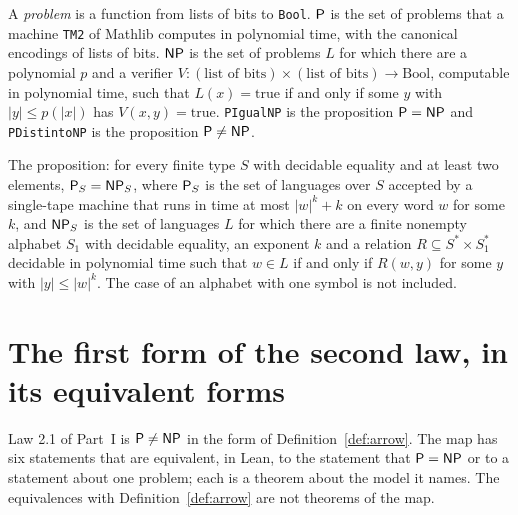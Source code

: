\begin{definition}[$\cP = \cNP$ and $\cP \ne \cNP$, on the machines of Mathlib]
  \label{def:arrow-p-ne-np}
  \leanok
  A \emph{problem} is a function from lists of bits to \texttt{Bool}. $\mathsf{P}$ is the set of problems
  that a machine \texttt{TM2} of Mathlib computes in polynomial time, with the canonical encodings of
  lists of bits. $\mathsf{NP}$ is the set of problems $L$ for which there are a polynomial $p$ and a
  verifier $V : (\text{list of bits}) \times (\text{list of bits}) \to \mathrm{Bool}$, computable in
  polynomial time, such that $L(x) = \mathrm{true}$ if and only if some $y$ with $|y| \le p(|x|)$ has
  $V(x, y) = \mathrm{true}$. \texttt{PIgualNP} is the proposition $\cP = \cNP$ and
  \texttt{PDistintoNP} is the proposition $\mathsf{P} \neq \mathsf{NP}$.
  \own{}
\end{definition}

\begin{definition}[$\cP = \cNP$, on single-tape machines with the alphabet as a parameter]
  \label{def:arrow-cook-p-eq-np}
  \leanok
  The proposition: for every finite type $S$ with decidable equality and at least two elements,
  $\mathsf{P}_S = \mathsf{NP}_S$, where $\mathsf{P}_S$ is the set of languages over $S$ accepted by a single-tape machine
  that runs in time at most $|w|^k + k$ on every word $w$ for some $k$, and $\mathsf{NP}_S$ is the set of
  languages $L$ for which there are a finite nonempty alphabet $S_1$ with decidable equality, an
  exponent $k$ and a relation $R \subseteq S^* \times S_1^*$ decidable in polynomial time such that
  $w \in L$ if and only if $R(w, y)$ for some $y$ with $|y| \le |w|^k$. The case of an alphabet with
  one symbol is not included.
  \own{}
\end{definition}

\section{The first form of the second law, in its equivalent forms}
\label{sec:arrow-forms}

Law 2.1 of Part~I is $\mathsf{P} \neq \mathsf{NP}$ in the form of Definition~\ref{def:arrow}. The map has six
statements that are equivalent, in Lean, to the statement that $\cP = \cNP$ or to a statement about
one problem; each is a theorem about the model it names. The equivalences with Definition~\ref{def:arrow}
are not theorems of the map.

